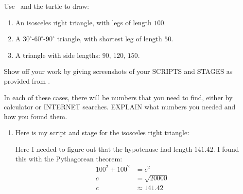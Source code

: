 \documentclass{ximera}
\begin{document}
\begin{question}
  Use \snap\ and the turtle to draw:
  \begin{enumerate}
  \item An isosceles right triangle, with legs of length $100$.
  \item A $30^\circ$-$60^\circ$-$90^\circ$ triangle, with shortest leg of length $50$.
  \item A triangle with side lengths: $90$, $120$, $150$.
  \end{enumerate}
  Show off your work by giving screenshots of your SCRIPTS and STAGES as
  provided from \snap.

  
  In each of these cases, there will be numbers that you need to find,
  either by calculator or INTERNET searches. EXPLAIN what numbers you
  needed and how you found them.
  
  \begin{freeResponse}
    \begin{enumerate}
    \item Here is my script and stage for the isosceles right
      triangle:
      \begin{center}
        \qquad
      \end{center}
      Here I needed to figure out that the hypotenuse had length
      $141.42$. I found this with the Pythagorean theorem:
      \begin{align*}
      100^2 + 100^2 &= c^2\\
      c &= \sqrt{20000}\\
      c &\approx 141.42
      \end{align*}
      

\end{enumerate}
\end{freeResponse}
\end{question}
\end{document}
